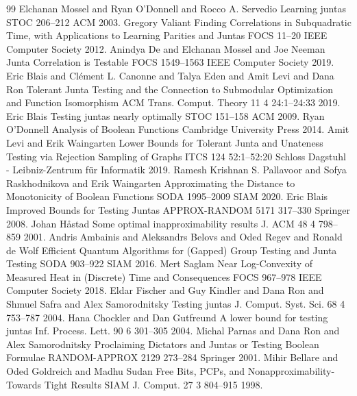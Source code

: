 \documentclass[10pt,a4paper]{article}
\theoremstyle{plain}
\theoremstyle{remark}
\theoremstyle{plain}
\begin{document}
\begin{thebibliography}{99}
 Elchanan Mossel and Ryan O'Donnell and Rocco A. Servedio Learning juntas {STOC} 206--212 {ACM} 2003.
 Gregory Valiant Finding Correlations in Subquadratic Time, with Applications to Learning Parities and Juntas {FOCS} 11--20 {IEEE} Computer Society 2012.
 Anindya De and Elchanan Mossel and Joe Neeman Junta Correlation is Testable {FOCS} 1549--1563 {IEEE} Computer Society 2019.
 Eric Blais and Cl{\'{e}}ment L. Canonne and Talya Eden and Amit Levi and Dana Ron Tolerant Junta Testing and the Connection to Submodular Optimization and Function Isomorphism {ACM} Trans. Comput. Theory 11 4 24:1--24:33 2019.
 Eric Blais Testing juntas nearly optimally {STOC} 151--158 {ACM} 2009.
 Ryan O'Donnell Analysis of Boolean Functions Cambridge University Press 2014.
 Amit Levi and Erik Waingarten Lower Bounds for Tolerant Junta and Unateness Testing via Rejection Sampling of Graphs {ITCS} 124 52:1--52:20 Schloss Dagstuhl - Leibniz-Zentrum f{\"{u}}r Informatik 2019.
 Ramesh Krishnan S. Pallavoor and Sofya Raskhodnikova and Erik Waingarten Approximating the Distance to Monotonicity of Boolean Functions {SODA} 1995--2009 {SIAM} 2020.
 Eric Blais Improved Bounds for Testing Juntas {APPROX-RANDOM} 5171 317--330 Springer 2008.
 Johan H{\aa}stad Some optimal inapproximability results J. {ACM} 48 4 798--859 2001.
 Andris Ambainis and Aleksandrs Belovs and Oded Regev and Ronald de Wolf Efficient Quantum Algorithms for (Gapped) Group Testing and Junta Testing {SODA} 903--922 {SIAM} 2016.
 Mert Saglam Near Log-Convexity of Measured Heat in (Discrete) Time and Consequences {FOCS} 967--978 {IEEE} Computer Society 2018.
 Eldar Fischer and Guy Kindler and Dana Ron and Shmuel Safra and Alex Samorodnitsky Testing juntas J. Comput. Syst. Sci. 68 4 753--787 2004.
 Hana Chockler and Dan Gutfreund A lower bound for testing juntas Inf. Process. Lett. 90 6 301--305 2004.
 Michal Parnas and Dana Ron and Alex Samorodnitsky Proclaiming Dictators and Juntas or Testing Boolean Formulae {RANDOM-APPROX} 2129 273--284 Springer 2001.
 Mihir Bellare and Oded Goldreich and Madhu Sudan Free Bits, PCPs, and Nonapproximability-Towards Tight Results {SIAM} J. Comput. 27 3 804--915 1998.

\end{thebibliography}
\end{document}
